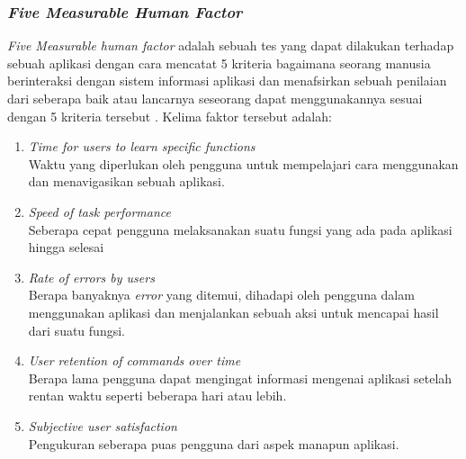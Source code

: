 \documentclass[a4paper]{article}
\newcommand{\subsubbab}[1]{%
    \subsubsection{#1}%
}
\begin{document}
\subsubbab{\textit{Five Measurable Human Factor}}
\textit{Five Measurable human factor} adalah sebuah tes yang dapat dilakukan terhadap sebuah aplikasi dengan cara mencatat 5 kriteria bagaimana seorang manusia berinteraksi dengan sistem informasi aplikasi dan menafsirkan sebuah penilaian dari seberapa baik atau lancarnya seseorang dapat menggunakannya sesuai dengan 5 kriteria tersebut \autocite[192-193]{Shneiderman_Plaisant_Cohen_Jacobs_Elmqvist_2018_5_factors}. Kelima faktor tersebut adalah:
\begin{enumerate}
    \item \textit{Time for users to learn specific functions}\\
    Waktu yang diperlukan oleh pengguna untuk mempelajari cara menggunakan dan menavigasikan sebuah aplikasi.
    \item \textit{Speed of task performance}\\
    Seberapa cepat pengguna melaksanakan suatu fungsi yang ada pada aplikasi hingga selesai
    \item \textit{Rate of errors by users}\\
    Berapa banyaknya \textit{error} yang ditemui, dihadapi oleh pengguna dalam menggunakan aplikasi dan menjalankan sebuah aksi untuk mencapai hasil dari suatu fungsi.
    \item \textit{User retention of commands over time}\\
    Berapa lama pengguna dapat mengingat informasi mengenai aplikasi setelah rentan waktu seperti beberapa hari atau lebih.
    \item \textit{Subjective user satisfaction}\\
    Pengukuran seberapa puas pengguna dari aspek manapun aplikasi.
\end{enumerate}
\end{document}
